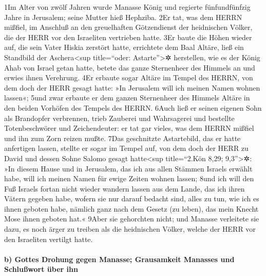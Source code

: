 1Im Alter von zwölf Jahren wurde Manasse König und regierte
fünfundfünfzig Jahre in Jerusalem; seine Mutter hieß Hephziba. 2Er tat,
was dem HERRN mißfiel, im Anschluß an den greuelhaften Götzendienst der
heidnischen Völker, die der HERR vor den Israeliten vertrieben hatte.
3Er baute die Höhen wieder auf, die sein Vater Hiskia zerstört hatte,
errichtete dem Baal Altäre, ließ ein Standbild der Aschera\textless sup
title=``oder: Astarte''\textgreater✲ herstellen, wie es der König Ahab
von Israel getan hatte, betete das ganze Sternenheer des Himmels an und
erwies ihnen Verehrung. 4Er erbaute sogar Altäre im Tempel des HERRN,
von dem doch der HERR gesagt hatte: »In Jerusalem will ich meinen Namen
wohnen lassen«; 5und zwar erbaute er dem ganzen Sternenheer des Himmels
Altäre in den beiden Vorhöfen des Tempels des HERRN. 6Auch ließ er
seinen eigenen Sohn als Brandopfer verbrennen, trieb Zauberei und
Wahrsagerei und bestellte Totenbeschwörer und Zeichendeuter: er tat gar
vieles, was dem HERRN mißfiel und ihn zum Zorn reizen mußte. 7Das
geschnitzte Astartebild, das er hatte anfertigen lassen, stellte er
sogar im Tempel auf, von dem doch der HERR zu David und dessen Sohne
Salomo gesagt hatte\textless sup title=``2.Kön 8,29; 9,3''\textgreater✲:
»In diesem Hause und in Jerusalem, das ich aus allen Stämmen Israels
erwählt habe, will ich meinen Namen für ewige Zeiten wohnen lassen; 8und
ich will den Fuß Israels fortan nicht wieder wandern lassen aus dem
Lande, das ich ihren Vätern gegeben habe, wofern sie nur darauf bedacht
sind, alles zu tun, wie ich es ihnen geboten habe, nämlich ganz nach dem
Gesetz (zu leben), das mein Knecht Mose ihnen geboten hat.« 9Aber sie
gehorchten nicht; und Manasse verleitete sie dazu, es noch ärger zu
treiben als die heidnischen Völker, welche der HERR vor den Israeliten
vertilgt hatte.

\hypertarget{b-gottes-drohung-gegen-manasse-grausamkeit-manasses-und-schluuxdfwort-uxfcber-ihn}{%
\paragraph{b) Gottes Drohung gegen Manasse; Grausamkeit Manasses und
Schlußwort über
ihn}\label{b-gottes-drohung-gegen-manasse-grausamkeit-manasses-und-schluuxdfwort-uxfcber-ihn}}

